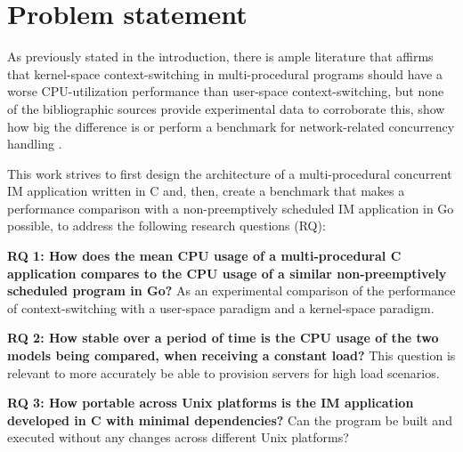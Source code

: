 \section{Problem statement}
As previously stated in the introduction, there is ample literature that affirms that kernel-space context-switching in multi-procedural programs should have a worse CPU-utilization performance than user-space context-switching, but none of the bibliographic sources provide experimental data to corroborate this, show how big the difference is or perform a benchmark for network-related concurrency handling \cite{2003Events}\cite{2005Threads}\cite{2013ContextSwitching}\cite{Cox-Buday2017}\cite{Kerrisk2010}.

This work strives to first design the architecture of a multi-procedural concurrent IM application written in C and, then, create a benchmark that makes a performance comparison with a non-preemptively scheduled IM application in Go possible, to address the following research questions (RQ):

\textbf{RQ 1: How does the mean CPU usage of a multi-procedural C application compares to the CPU usage of a similar non-preemptively scheduled program in Go?} As an experimental comparison of the performance of context-switching with a user-space paradigm and a kernel-space paradigm.

\textbf{RQ 2: How stable over a period of time is the CPU usage of the two models being compared, when receiving a constant load?} This question is relevant to more accurately be able to provision servers for high load scenarios.

\textbf{RQ 3: How portable across Unix platforms is the IM application developed in C with minimal dependencies?} Can the program be built and executed without any changes across different Unix platforms?




